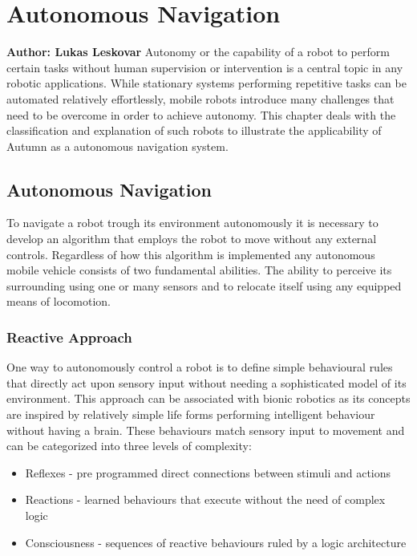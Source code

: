 \chapter{Autonomous Navigation}

\textbf{Author: Lukas Leskovar} 
Autonomy or the capability of a robot to perform certain tasks without human supervision or intervention is a central topic in any robotic applications.
While stationary systems performing repetitive tasks can be automated relatively effortlessly, mobile robots introduce many challenges that need to be overcome in order to achieve autonomy.
This chapter deals with the classification and explanation of such robots to illustrate the applicability of Autumn as a autonomous navigation system.

\section{Autonomous Navigation}
To navigate a robot trough its environment autonomously it is necessary to develop an algorithm that employs the robot to move without any external controls. Regardless of how this algorithm is implemented any autonomous mobile vehicle consists of two fundamental abilities. The ability to perceive its surrounding using one or many sensors and to relocate itself using any equipped means of locomotion. 

\subsection{Reactive Approach}
One way to autonomously control a robot is to define simple behavioural rules that directly act upon sensory input without needing a sophisticated model of its environment. 
This approach can be associated with bionic robotics as its concepts are inspired by relatively simple life forms performing intelligent behaviour without having a brain. 
These behaviours match sensory input to movement and can be categorized into three levels of complexity:
\begin{itemize}
	\item Reflexes - pre programmed direct connections between stimuli and actions
	\item Reactions - learned behaviours that execute without the need of complex logic 
	\item Consciousness - sequences of reactive behaviours ruled by a logic architecture
\end{itemize}


